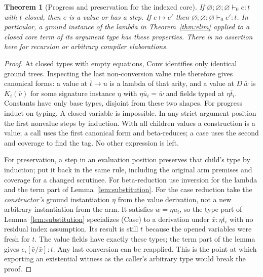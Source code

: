 \documentclass[11pt]{article}
\newtheorem{theorem}{Theorem}[section]
\theoremstyle{definition}
\newcommand{\arr}{\mathbin{\to}}
\begin{document}
\begin{theorem}[Progress and preservation for the indexed core]\label{thm:safety}
If $\varnothing;\varnothing;\varnothing\vdash_0 e:t$ with $t$ closed,
then $e$ is a value or has a step. If $e\longmapsto e'$ then
$\varnothing;\varnothing;\varnothing\vdash_0 e':t$.
In particular, a ground instance of the lambda in Theorem~\ref{thm:elim}
applied to a closed core term of its argument type has these properties.
There is no assertion here for recursion or arbitrary compiler elaborations.
\end{theorem}
\begin{proof}
At closed types with empty equations, \textsf{Conv} identifies only
identical ground trees. Inspecting the last non-conversion value rule
therefore gives canonical forms: a value at $\bar t\arr u$ is a lambda
of that arity, and a value at $D\,\bar w$ is $K_i(\bar v)$ for some
signature instance $\eta$ with $\eta\bar u_i=\bar w$ and fields typed
at $\eta\bar t_i$. Constants have only base types, disjoint from these
two shapes. For progress induct on typing. A closed variable is
impossible. In any strict argument position the first nonvalue steps by
induction. With all children values a construction is a value; a call
uses the first canonical form and beta-reduces; a case uses the second
and coverage to find the tag. No other expression is left.

For preservation, a step in an evaluation position preserves that child's
type by induction; put it back in the same rule, including the original
arm premises and coverage for a changed scrutinee. For beta-reduction
use inversion for the lambda and the term part of
Lemma~\ref{lem:substitution}. For the case reduction take the
\emph{constructor's} ground instantiation $\eta$ from the value
derivation, not a new arbitrary instantiation from the arm. It satisfies
$\bar w=\eta\bar u_i$, so the type part of Lemma~\ref{lem:substitution}
specializes (Case) to a derivation under $\bar x:\eta\bar t_i$ with
no residual index assumption. Its result is still $t$ because the opened
variables were fresh for $t$. The value fields have exactly these types;
the term part of the lemma gives $e_i[\bar v/\bar x]:t$. Any last
conversion can be reapplied. This is the point at which exporting an
existential witness as the caller's arbitrary type would break the proof.
\end{proof}
\end{document}
